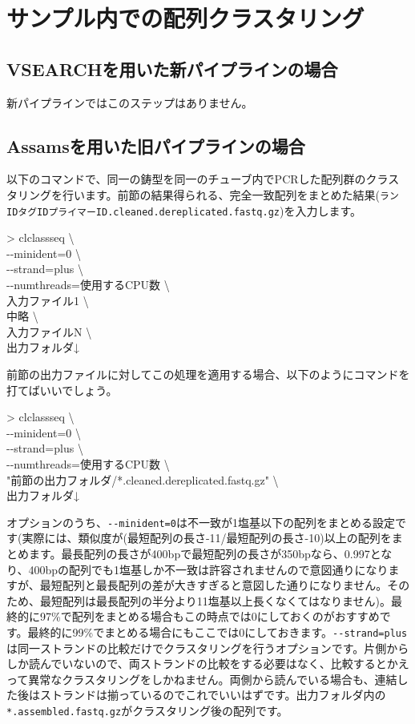 \documentclass[titlepage,10pt,a4paper]{jsbook}
\newenvironment{cmd}{\begin{oframed}\raggedright\ttfamily\footnotesize\setlength{\baselineskip}{1.4em}}{\end{oframed}\vspace{-1em}}
\begin{document}
\section{サンプル内での配列クラスタリング}

\subsection{VSEARCHを用いた新パイプラインの場合}

新パイプラインではこのステップはありません。

\subsection{Assamsを用いた旧パイプラインの場合}

以下のコマンドで、同一の鋳型を同一のチューブ内でPCRした配列群のクラスタリングを行います。前節の結果得られる、完全一致配列をまとめた結果(\texttt{ランID{\textunderscore}{\textunderscore}タグID{\textunderscore}{\textunderscore}プライマーID.cleaned.dereplicated.fastq.gz})を入力します。
\begin{cmd}
{\textgreater} clclassseq {\textbackslash}\\
{-}{-}minident=0 {\textbackslash}\\
{-}{-}strand=plus {\textbackslash}\\
{-}{-}numthreads=使用するCPU数 {\textbackslash}\\
入力ファイル1 {\textbackslash}\\
中略 {\textbackslash}\\
入力ファイルN {\textbackslash}\\
出力フォルダ↓
\end{cmd}
前節の出力ファイルに対してこの処理を適用する場合、以下のようにコマンドを打てばいいでしょう。
\begin{cmd}
{\textgreater} clclassseq {\textbackslash}\\
{-}{-}minident=0 {\textbackslash}\\
{-}{-}strand=plus {\textbackslash}\\
{-}{-}numthreads=使用するCPU数 {\textbackslash}\\
"前節の出力フォルダ/*.cleaned.dereplicated.fastq.gz" {\textbackslash}\\
出力フォルダ↓
\end{cmd}
オプションのうち、\texttt{{-}{-}minident=0}は不一致が1塩基以下の配列をまとめる設定です(実際には、類似度が(最短配列の長さ-11/最短配列の長さ-10)以上の配列をまとめます。最長配列の長さが400bpで最短配列の長さが350bpなら、0.997となり、400bpの配列でも1塩基しか不一致は許容されませんので意図通りになりますが、最短配列と最長配列の差が大きすぎると意図した通りになりません。そのため、最短配列は最長配列の半分より11塩基以上長くなくてはなりません)。最終的に97\%で配列をまとめる場合もこの時点では0にしておくのがおすすめです。最終的に99\%でまとめる場合にもここでは0にしておきます。\texttt{{-}{-}strand=plus}は同一ストランドの比較だけでクラスタリングを行うオプションです。片側からしか読んでいないので、両ストランドの比較をする必要はなく、比較するとかえって異常なクラスタリングをしかねません。両側から読んでいる場合も、連結した後はストランドは揃っているのでこれでいいはずです。出力フォルダ内の\texttt{*.assembled.fastq.gz}がクラスタリング後の配列です。
\end{document}
